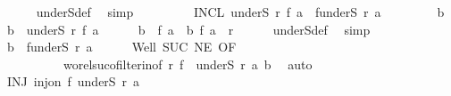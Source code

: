 \begin{isabellebody}
\ \ \ \ \isamarkupfalse%
\ underS{\isacharunderscore}{\kern0pt}def\ \isamarkupfalse%
\ simp\isanewline
\ \ \isamarkupfalse%
\isanewline
\ \ \isanewline
\ \ \isamarkupfalse%
\ INCL{}{\isacharcolon}{\kern0pt}\ {\isachardoublequoteopen}underS\ r{\isacharprime}{\kern0pt}\ {\isacharparenleft}{\kern0pt}f\ a{\isacharparenright}{\kern0pt}\ {\isasymle}\ f{\isacharbackquote}{\kern0pt}{\isacharparenleft}{\kern0pt}underS\ r\ a{\isacharparenright}{\kern0pt}{\isachardoublequoteclose}\isanewline
\ \ \isamarkupfalse%
\isanewline
\ \ \ \ \isamarkupfalse%
\ b{\isacharprime}{\kern0pt}\ \isamarkupfalse%
\ {\isachardoublequoteopen}b{\isacharprime}{\kern0pt}\ {\isasymin}\ underS\ r{\isacharprime}{\kern0pt}\ {\isacharparenleft}{\kern0pt}f\ a{\isacharparenright}{\kern0pt}{\isachardoublequoteclose}\isanewline
\ \ \ \ \isamarkupfalse%
\ {\isachardoublequoteopen}b{\isacharprime}{\kern0pt}\ {\isasymnoteq}\ f\ a\ {\isasymand}\ {\isacharparenleft}{\kern0pt}b{\isacharprime}{\kern0pt}{\isacharcomma}{\kern0pt}\ f\ a{\isacharparenright}{\kern0pt}\ {\isasymin}\ r{\isacharprime}{\kern0pt}{\isachardoublequoteclose}\isanewline
\ \ \ \ \isamarkupfalse%
\ underS{\isacharunderscore}{\kern0pt}def\ \isamarkupfalse%
\ simp\isanewline
\ \ \ \ \isamarkupfalse%
\ {\isachardoublequoteopen}b{\isacharprime}{\kern0pt}\ {\isasymin}\ f{\isacharbackquote}{\kern0pt}{\isacharparenleft}{\kern0pt}underS\ r\ a{\isacharparenright}{\kern0pt}{\isachardoublequoteclose}\isanewline
\ \ \ \ \isamarkupfalse%
\ Well{\isacharprime}{\kern0pt}\ SUC\ NE\ OF{\isacharprime}{\kern0pt}\isanewline
\ \ \ \ \ \ \ \ \ \ wo{\isacharunderscore}{\kern0pt}rel{\isachardot}{\kern0pt}suc{\isacharunderscore}{\kern0pt}ofilter{\isacharunderscore}{\kern0pt}in{\isacharbrackleft}{\kern0pt}of\ r{\isacharprime}{\kern0pt}\ {\isachardoublequoteopen}f\ {\isacharbackquote}{\kern0pt}\ underS\ r\ a{\isachardoublequoteclose}\ b{\isacharprime}{\kern0pt}{\isacharbrackright}{\kern0pt}\ \isamarkupfalse%
\ auto\isanewline
\ \ \isamarkupfalse%
\isanewline
\ \ \isanewline
\ \ \isamarkupfalse%
\ INJ{\isacharcolon}{\kern0pt}\ {\isachardoublequoteopen}inj{\isacharunderscore}{\kern0pt}on\ f\ {\isacharparenleft}{\kern0pt}underS\ r\ a{\isacharparenright}{\kern0pt}{\isachardoublequoteclose}\isanewline
\ \ \isamarkupfalse%
{\isacharminus}{\kern0pt}\isanewline
\ \ \ \ \isamarkupfalse%

\end{isabellebody}
